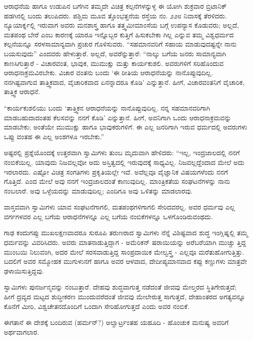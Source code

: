 ಆರಾಧನೆಯ ಹಾಗೂ ಉಡುಪಿನ ಬಗೆಗಿನ ತಮ್ಮದೇ ವಿಚಿತ್ರ ಕಲ್ಪನೆಗಳನ್ನುಳ್ಳ ಈ ಯೋಗಿ ಶುಕ್ರವಾರ ಬ್ರಿಟಾನಿಕ್ ಹಡಗಿನಲ್ಲಿ ಬಂದು ತಲುಪಿದರು. ಪಶ್ಚಿಮ ಮೂವ ತ್ತೊಂಭತ್ತನೆಯ ರಸ್ತೆಯ ನಂ. ೨೨೮ ನಿವಾಸಕ್ಕೆ ತೆರಳಿದರು. ನ್ಯೂಯಾರ್ಕ್ನಲ್ಲಿ ಇರುವಾಗ ಅವರು ಮನಶಾಸ್ತ್ರ ಹಾಗೂ ತತ್ತ್ವಮೀಮಾಂಸೆಯ ಬಗ್ಗೆ ಉಪನ್ಯಾಸ ಕೊಡುವರು; ಅಲ್ಲದೆ, ಮತಪಂಥ ಬೇರೆ ಎಂಬ ಕಾರಣಕ್ಕೆ ಯಾರೂ ಇನ್ನೊಬ್ಬರ ಕುತ್ತಿಗೆ ಹಿಸುಕಬೇಕಾ ಗಿಲ್ಲ ಎನ್ನುವ ತಮ್ಮ ವಿಶ್ವಧರ್ಮದ ಕಲ್ಪನೆಯನ್ನೂ ಸರಳಸಾಮಾನ್ಯವಾಗಿ ಪ್ರಚುರ ಗೊಳಿಸುವರು. “ಸಹಮಾನವರಿಗೆ ಸಹಾಯ ಮಾಡುವುದಷ್ಟನ್ನೇ ನಾನು ಬಯಸುವುದು” ಎಂದವರು ಹೇಳುತ್ತಾರೆ. ಅಲ್ಲದೆ, ಅವರೆನ್ನುತ್ತಾರೆ: “ನಾಲ್ಕು ಬಗೆಯ ಜನರು ಸಾಮಾನ್ಯವಾಗಿ ಕಾಣಸಿಗುತ್ತಾರೆ - ವಿಚಾರವಂತ, ಭಾವುಕ, ಮುಮುಕ್ಷು ಮತ್ತು ಕಾರ್ಯಕುಶಲಿ. ಅವರುಗಳಿಗೆ ಸರಿಹೊಂದುವ ಆರಾಧನಾಕ್ರಮವಿರಬೇಕು. ವಿಚಾರ ವಂತನು ಬಂದು ‘ಈ ರೀತಿಯ ಆರಾಧನೆಯನ್ನು ನಾನೊಪ್ಪುವುದಿಲ್ಲ. ನನಗಿಷ್ಟವಾಗುವ ತಾತ್ತ್ವಿಕವಾದ, ವೈಚಾರಿಕವಾದ ಏನನ್ನಾದರೂ ಕೊಡಿ’ ಎನ್ನುತ್ತಾನೆ. ಹೀಗೆ, ವಿಚಾರವಂತನಿಗೆ ವೈಚಾರಿಕ, ತಾತ್ತ್ವಿಕ ಆರಾಧನೆ.

“ಕಾರ್ಯಕುಶಲಿಯು ಬಂದು ‘ತಾತ್ತ್ವಿಕನ ಆರಾಧನೆಯನ್ನು ನಾನೊಪ್ಪುವುದಿಲ್ಲ. ನನ್ನ ಸಹಮಾನವರಿಗಾಗಿ ಮಾಡಬಹುದಾದಂತಹ ಕೆಲಸವನ್ನು ನನಗೆ ಕೊಡಿ’ ಎನ್ನುತ್ತಾನೆ. ಹೀಗೆ, ಅವನಿಗಾಗಿ ಒಂದು ಆರಾಧನಾಕ್ರಮವನ್ನು ಮಾಡಬೇಕು; ಅಂತೆಯೇ ಮುಮುಕ್ಷು ಹಾಗೂ ಭಾವುಕರುಗಳಿಗೆ. ಈ ಎಲ್ಲ ಜನರಿಗಾಗಿ ಇರುವ ಧರ್ಮದಲ್ಲಿ ಅವರುಗಳು ಒಪ್ಪು ವಂತಹ ಈ ಎಲ್ಲ ಅಂಶಗಳೂ ಇರಬೇಕು.”

ಅಷ್ಟರಲ್ಲಿ ಪ್ರಶ್ನೆಯೊಂದಕ್ಕೆ ಉತ್ತರವಾಗಿ ಸ್ವಾಮಿಗಳು ತುಂಬ ಮೃದುವಾಗಿ ಹೇಳಿದರು: “ಇಲ್ಲ, ಇಂದ್ರಜಾಲದಲ್ಲಿ ನನಗೆ ನಂಬಿಕೆಯಿಲ್ಲ. ಯಾವುದು ನಿಜವಲ್ಲವೋ ಅದು ಅಸ್ತಿತ್ವದಲ್ಲಿ ಇರುವುದಕ್ಕೆ ಸಾಧ್ಯವಿಲ್ಲ. ನಿಜವಲ್ಲದ್ದೆಂದಾದ ಮೇಲೆ ಅದು ಇರಲಾರದು. ಎಷ್ಟೋ ವಿಚಿತ್ರ ಸಂಗತಿಗಳು ಪ್ರಕೃತಿಯಲ್ಲೇ ಇವೆ. ಅವೆಲ್ಲವೂ ವೈಜ್ಞಾನಿಕ ವಿಷಯಗಳೆಂದು ನನಗೆ ಗೊತ್ತಿದೆ. ಎಂದ ಮೇಲೆ ಅವು ನನಗೆ ಇಂದ್ರಜಾಲದಂತೆ ಕಾಣುವುದಿಲ್ಲ. ಮಾಂತ್ರಿಕತೆಯ ಸಂಘಟನೆಗಳನ್ನು ನಾನು ನಂಬಲಾರೆ. ಅವು ಒಳ್ಳೆಯದನ್ನು ಮಾಡುವುದಿಲ್ಲ; ಎಂದಿಗೂ ಅವು ಒಳಿತನ್ನು ಮಾಡಲಾರವು.

ವಾಸ್ತವವಾಗಿ ಸ್ವಾಮಿಗಳು ಯಾವ ಸಂಘಟನೆಗಾಗಲಿ, ಮತಪಂಥಗಳಿಗಾಗಲಿ ಸೇರಿದವರಲ್ಲ. ಅವರ ಧರ್ಮವು ಎಲ್ಲ ವರ್ಗಗಳವರ ಎಲ್ಲ ಬಗೆಯ ಆರಾಧನೆಗಳನ್ನೂ ಎಲ್ಲ ಬಗೆಯ ನಂಬಿಕೆಗಳನ್ನೂ ಒಳಗೊಂಡಿರುವಂಥದು.

ಗಾಢ ಕಂದುಗಪ್ಪು ಮುಖಲಕ್ಷಣವಾದರೂ ಸುರೂಪಿ ತರುಣರಾದ ಸ್ವಾಮಿಗಳು ನೆನ್ನೆ ವಿಶಿಷ್ಟವಾದ ಶುದ್ಧ ಇಂಗ್ಲಿಷ್ನಲ್ಲಿ ತಮ್ಮ ಧರ್ಮವನ್ನು ವಿವರಿಸಿದರು. ಅವರು ಮಾತನಾಡುತ್ತಿದ್ದಾಗ - ಅಮೆರಿಕನ್ ಷರಾಯಿಯನ್ನು ಅರೆಬರೆಯಾಗಿ ಮುಚ್ಚು ತ್ತಿದ್ದ ಮುಂಬಯಿ ನಿಲುವಂಗಿ, ಅದರ ಮೇಲೆ ಸರಸವಾಡುತ್ತಿದ್ದ ಸಾಂಪ್ರದಾಯಿಕ ಮೇಲ್ವಸ್ತ್ರ - ಎಲ್ಲವೂ ಮರೆತುಹೋಗುತ್ತಿತ್ತು. ಬದಲಿಗೆ ಅವರ ಸಮ್ಮೋಹಕ ಮುಗುಳುನಗೆ ಹಾಗೂ ಅವರ ಆಳವಾದ, ದೇದೀಪ್ಯಮಾನವಾದ ಕಪ್ಪು ಕಣ್ಣುಗಳು ಮಾತ್ರವೇ ಢಳಾಯಿಸುತ್ತಿದ್ದವು.

ಸ್ವಾಮಿಗಳು ಪುನರ್ಜನ್ಮವನ್ನು ನಂಬುತ್ತಾರೆ. ದೇಹವು ಶುದ್ಧವಾಗುತ್ತ ನಡೆದಂತೆ ಜೀವವು ಮೇಲ್ತರದ ಸ್ಥಿತಿಗೇರುತ್ತದೆ; ಹೀಗೆ ದ್ರವ್ಯದ ಮಟ್ಟದ ಶುದ್ಧೀಕರಣ ಮುಂದುವರೆದಂತೆ ಜೀವವು ಮೇಲೇರುತ್ತ ಸಾಗುತ್ತದೆ, ದೇಹಾಂತರದ ಅಗತ್ಯವನ್ನೂ ಕೊನೆಗೆ ಮೀರಿ, ವಿಶ್ವಚೇತನದೊಂದಿಗೆ ಒಂದಾಗಿ ಸೇರಿಹೋಗುತ್ತದೆ ಎಂದು ಅವರ ನಂಬಿಕೆ.

ಈಗತಾನೆ ಈ ದೇಶಕ್ಕೆ ಬಂದಿರುವ (ಹರ್ಮನ್?) ಅಲ್ವಾರ್ಟ್ರಂತಹ ಯಹೂದಿ - ಹೊಂಚುಕ ಮನುಷ್ಯ ಅವರಿಗೆ ಅರ್ಥವಾಗಲಾರ.

